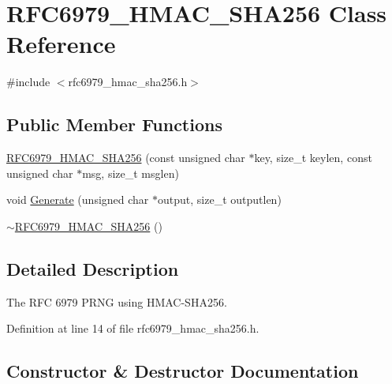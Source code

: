 \hypertarget{class_r_f_c6979___h_m_a_c___s_h_a256}{}\section{R\+F\+C6979\+\_\+\+H\+M\+A\+C\+\_\+\+S\+H\+A256 Class Reference}
\label{class_r_f_c6979___h_m_a_c___s_h_a256}


{\ttfamily \#include $<$rfc6979\+\_\+hmac\+\_\+sha256.\+h$>$}

\subsection*{Public Member Functions}
\begin{DoxyCompactItemize}
\item 
\hyperlink{class_r_f_c6979___h_m_a_c___s_h_a256_aeab9ec7d2a564e2d98f2157ee7b83bef}{R\+F\+C6979\+\_\+\+H\+M\+A\+C\+\_\+\+S\+H\+A256} (const unsigned char $\ast$key, size\+\_\+t keylen, const unsigned char $\ast$msg, size\+\_\+t msglen)
\item 
void \hyperlink{class_r_f_c6979___h_m_a_c___s_h_a256_a9f841d552097f528631538e9939e0f70}{Generate} (unsigned char $\ast$output, size\+\_\+t outputlen)
\item 
\hyperlink{class_r_f_c6979___h_m_a_c___s_h_a256_aae9e35137b1201051005a175268f52a7}{$\sim$\+R\+F\+C6979\+\_\+\+H\+M\+A\+C\+\_\+\+S\+H\+A256} ()
\end{DoxyCompactItemize}


\subsection{Detailed Description}
The R\+F\+C 6979 P\+R\+N\+G using H\+M\+A\+C-\/\+S\+H\+A256. 

Definition at line 14 of file rfc6979\+\_\+hmac\+\_\+sha256.\+h.



\subsection{Constructor \& Destructor Documentation}
\hypertarget{class_r_f_c6979___h_m_a_c___s_h_a256_aeab9ec7d2a564e2d98f2157ee7b83bef}{}
